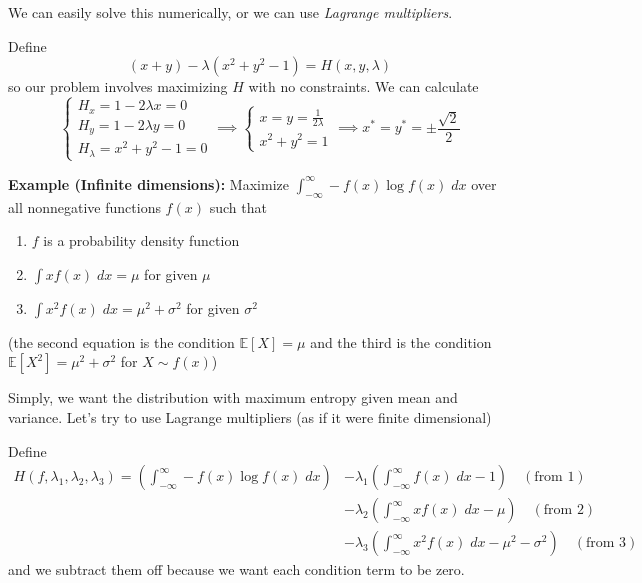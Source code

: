 \documentclass[12pt]{report}
\newcommand{\E}{\mathbb{E}}
\begin{document}
        We can easily solve this numerically, or we can use \emph{Lagrange multipliers}. 
        
        Define
        \[(x + y) - \lambda(x^2 + y^2 - 1) = H(x, y, \lambda)\]
        so our problem involves maximizing $H$ with no constraints. We can calculate 
        \[\begin{cases}
            H_x = 1 - 2\lambda x = 0\\ 
            H_y = 1 - 2\lambda y = 0\\
            H_{\lambda} = x^2 + y^2 - 1 = 0
        \end{cases} \implies \begin{cases}
            x = y = \frac{1}{2\lambda}\\ 
            x^2 + y^2 = 1
        \end{cases} \implies x^* = y^* = \pm \frac{\sqrt 2}{2}\]

        \textbf{Example (Infinite dimensions):} Maximize $\int_{-\infty}^{\infty} -f(x) \log f(x) \; dx$ over all nonnegative functions $f(x)$ such that 
        \begin{enumerate}
            \item $f$ is a probability density function
            \item $\int x f(x)\; dx = \mu$ for given $\mu$ 
            \item $\int x^2 f(x) \; dx = \mu^2 + \sigma^2$ for given $\sigma^2$
        \end{enumerate} 
        (the second equation is the condition $\E[X] = \mu$ and the third is the condition $\E[X^2] = \mu^2 + \sigma^2$ for $X \sim f(x)$) 

        Simply, we want the distribution with maximum entropy given mean and variance. Let's try to use Lagrange multipliers (as if it were finite dimensional) 

        Define 
        \begin{align*}
            H(f, \lambda_1, \lambda_2, \lambda_3) = \left(\int_{-\infty}^{\infty} -f(x)\log f(x)\; dx\right) &- \lambda_1\left(\int_{-\infty}^{\infty} f(x)\; dx - 1\right) \quad (\text{from 1})\\ 
            &- \lambda_2 \left(\int_{-\infty}^{\infty} xf(x)\; dx - \mu\right) \quad (\text{from 2})\\ 
            &- \lambda_3 \left(\int_{-\infty}^{\infty} x^2 f(x)\; dx - \mu^2 - \sigma^2\right) \quad (\text{from 3})
        \end{align*}
        and we subtract them off because we want each condition term to be zero. 
\end{document}
